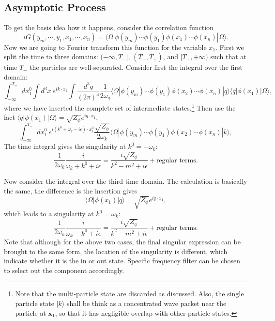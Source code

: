 \subsection{Asymptotic Process}
To get the basis idea how it happens, consider the correlation function
\begin{equation}
	iG(y_m,\cdots,y_1,x_1,\cdots,x_n) = \langle\Omega|\phi(y_m)\cdots\phi(y_1) \phi(x_1)\cdots\phi(x_n)|\Omega\rangle.
\end{equation}
Now we are going to Fourier transform this function for the variable $x_1$.
First we split the time to three domains: $(-\infty,T_-]$, $(T_-,T_+)$, and $[T_+,+\infty)$ such that at time $T_{\pm}$ the particles are well-separated.
Consider first the integral over the first domain:
\begin{equation}
	\int_{-\infty}^{T_-} dx_1^0 \int d^3 x\ e^{i k\cdot x_1} \int \frac{d^3q}{(2\pi)^3}\frac{1}{2\omega_q}\langle \Omega|\phi(y_m)\cdots\phi(y_1) \phi(x_2)\cdots\phi(x_n)|q\rangle \langle q|\phi(x_1) |\Omega\rangle,
\end{equation}
where we have inserted the complete set of intermediate states.\footnote{Note that the multi-particle state are discarded as discussed. Also, the single particle state $|k\rangle$ shall be think as a concentrated wave packet near the particle at $\bm x_1$, so that it has negligible overlap with other particle states.}
Then use the fact $\langle q|\phi(x_1)|\Omega\rangle = \sqrt{Z_\phi} e^{i q \cdot x_1}$, 
\begin{equation}
	\int_{-\infty}^{T_-} dx_1^0 \ e^{i (k^0+\omega_q-i\epsilon)\cdot x_1^0}\frac{\sqrt{Z_\phi}}{2\omega_k}\langle \Omega|\phi(y_m)\cdots\phi(y_1) \phi(x_2)\cdots\phi(x_n)|k\rangle,
\end{equation}
The time integral gives the singularity at $k^0=-\omega_k$:
\begin{equation}
	\frac{1}{2\omega_k} \frac{i}{\omega_k+k^0 + i\epsilon} = \frac{i\sqrt{Z_\phi}}{k^2-m^2+i\epsilon} + \text{regular terms}.
\end{equation}

Now consider the integral over the third time domain.
The calculation is basically the same, the difference is the insertion gives
\begin{equation*}
	\langle\Omega| \phi(x_1) |q\rangle = \sqrt{Z_\phi} e^{i q \cdot x_1},
\end{equation*}
which leads to a singularity at $k^0=\omega_k$:
\begin{equation}
	\frac{1}{2\omega_k} \frac{i}{\omega_k-k^0 + i\epsilon} = \frac{i\sqrt{Z_\phi}}{k^2-m^2+i\epsilon} + \text{regular terms}.
\end{equation}
Note that although for the above two cases, the final singular expression can be brought to the same form, the location of the singularity is different, which indicate whether it is the in or out state.
Specific frequency filter can be chosen to select out the component accordingly.

